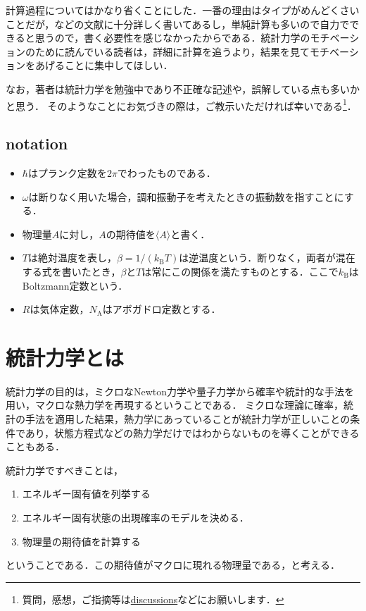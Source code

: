 	計算過程についてはかなり省くことにした．一番の理由はタイプがめんどくさいことだが，\cite{Tasaki_statmech}などの文献に十分詳しく書いてあるし，単純計算も多いので自力でできると思うので，書く必要性を感じなかったからである．統計力学のモチベーションのために読んでいる読者は，詳細に計算を追うより，結果を見てモチベーションをあげることに集中してほしい．

    なお，著者は統計力学を勉強中であり不正確な記述や，誤解している点も多いかと思う．
    そのようなことにお気づきの際は，ご教示いただければ幸いである\footnote{質問，感想，ご指摘等は\href{https://github.com/toshitnk/hp/discussions/4}{discussions}などにお願いします．}．
	\subsection{notation}
	\begin{itemize}
			\item $\hbar$はプランク定数を$2\pi$でわったものである．
			\item $\omega$は断りなく用いた場合，調和振動子を考えたときの振動数を指すことにする．
			\item 物理量$A$に対し，$A$の期待値を$\langle A \rangle$と書く．
			\item $T$は絶対温度を表し，$\beta = 1/(k_{\text{B}}T)$は逆温度という．断りなく，両者が混在する式を書いたとき，$\beta$と$T$は常にこの関係を満たすものとする．ここで$k_{\text{B}}$はBoltzmann定数という．
			\item $R$は気体定数，$N_{\text{A}}$はアボガドロ定数とする．
	\end{itemize}

	\section{統計力学とは}\label{sec:motivation}

	統計力学の目的は，ミクロなNewton力学や量子力学から確率や統計的な手法を用い，マクロな熱力学を再現するということである．
	ミクロな理論に確率，統計の手法を適用した結果，熱力学にあっていることが統計力学が正しいことの条件であり，状態方程式などの熱力学だけではわからないものを導くことができることもある．

	統計力学ですべきことは，
	\begin{enumerate}
			\item エネルギー固有値を列挙する
			\item エネルギー固有状態の出現確率のモデルを決める．
			\item 物理量の期待値を計算する
	\end{enumerate}
	ということである．この期待値がマクロに現れる物理量である，と考える．

